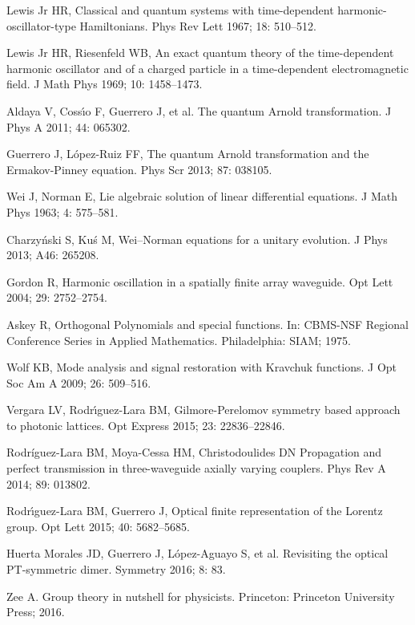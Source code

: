 \documentclass[12pt]{iopart}
\begin{document}
\begin{thebibliography}{100}
	 Lewis Jr HR,
	Classical and quantum systems with time-dependent harmonic-oscillator-type Hamiltonians.
	Phys Rev Lett 1967;  18: 510--512.
		
	  Lewis Jr HR, Riesenfeld WB,
	An exact quantum theory of the time-dependent harmonic oscillator and of a charged particle in a time-dependent electromagnetic field.
	J Math Phys 1969;  10: 1458--1473.
			
	 Aldaya V, Coss\'{\i}o F, Guerrero J, et al.
	The quantum Arnold transformation.
	J Phys A 2011;  44: 065302.
		
	  Guerrero J, L\'opez-Ruiz FF,
	The quantum Arnold transformation and the Ermakov-Pinney equation.
	Phys Scr 2013;  87: 038105.
	
	
	 Wei J, Norman E,
	Lie  algebraic  solution  of  linear  differential  equations.
	J Math Phys 1963;  4: 575--581.
	
	
	 Charzy\'nski S, Ku\'s M,
	Wei--Norman equations for a unitary evolution.
	J Phys 2013;  A46: 265208.
	
	 Gordon R,
	Harmonic oscillation in a spatially finite array waveguide.
	Opt Lett 2004;  29: 2752--2754.
	
	 Askey R,
	Orthogonal Polynomials and special functions.
	In: CBMS-NSF Regional Conference Series in Applied Mathematics. Philadelphia: SIAM; 1975.
	
	 Wolf KB,
	Mode analysis and signal restoration with Kravchuk functions.
	J Opt Soc Am A 2009;  26: 509--516.
	
	  Vergara LV, Rodr\'{\i}guez-Lara BM,
	Gilmore-Perelomov symmetry based approach to photonic lattices.
	Opt Express 2015;  23: 22836--22846.
	
	 Rodr\'iguez-Lara BM, Moya-Cessa HM, Christodoulides DN
	Propagation and perfect transmission in three-waveguide axially varying couplers.
	Phys Rev A 2014;  89: 013802.
	
	 Rodr\'{\i}guez-Lara BM, Guerrero J,
	Optical finite representation of the Lorentz group.
	Opt Lett 2015;  40: 5682--5685.
	
	
	  Huerta Morales JD, Guerrero J,	L\'opez-Aguayo S, et al.
	Revisiting the optical PT-symmetric dimer.
	Symmetry 2016;  8: 83.
	
	
	  Zee A. Group theory in nutshell for physicists. Princeton: Princeton University Press; 2016.
	


\end{thebibliography}
\end{document}
